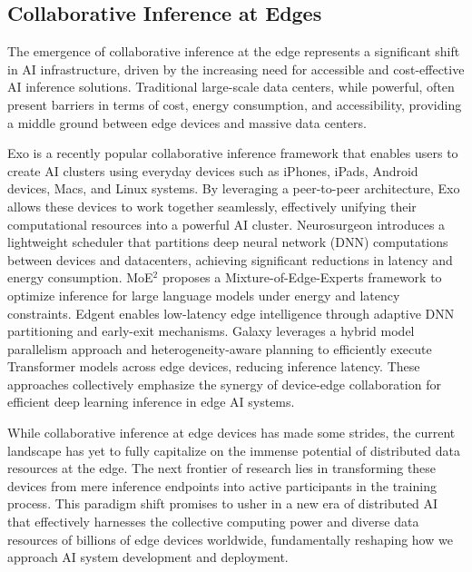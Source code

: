 \subsection{Collaborative Inference at Edges}\label{subsec:collaborative_inference}
The emergence of collaborative inference at the edge represents a significant shift in AI infrastructure, driven by the increasing need for accessible and cost-effective AI inference solutions. 
Traditional large-scale data centers, while powerful, often present barriers in terms of cost, energy consumption, and accessibility, providing a middle ground between edge devices and massive data centers.


Exo \cite{exo} is a recently popular collaborative inference framework that enables users to create AI clusters using everyday devices such as iPhones, iPads, Android devices, Macs, and Linux systems. By leveraging a peer-to-peer architecture, Exo allows these devices to work together seamlessly, effectively unifying their computational resources into a powerful AI cluster.
Neurosurgeon \cite{kang2017neurosurgeon} introduces a lightweight scheduler that partitions deep neural network (DNN) computations between devices and datacenters, achieving significant reductions in latency and energy consumption. 
MoE$^2$ \cite{jin2025moe2} proposes a Mixture-of-Edge-Experts framework to optimize inference for large language models under energy and latency constraints. 
Edgent \cite{li2018edgent} enables low-latency edge intelligence through adaptive DNN partitioning and early-exit mechanisms. 
Galaxy \cite{ye2024galaxy} leverages a hybrid model parallelism approach and heterogeneity-aware planning to efficiently execute Transformer models across edge devices, reducing inference latency. These approaches collectively emphasize the synergy of device-edge collaboration for efficient deep learning inference in edge AI systems.


While collaborative inference at edge devices has made some strides, the current landscape has yet to fully capitalize on the immense potential of distributed data resources at the edge. The next frontier of research lies in transforming these devices from mere inference endpoints into active participants in the training process. This paradigm shift promises to usher in a new era of distributed AI that effectively harnesses the collective computing power and diverse data resources of billions of edge devices worldwide, fundamentally reshaping how we approach AI system development and deployment.


